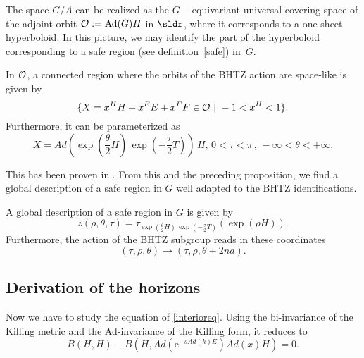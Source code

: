 The space $G/A$ can be realized as the $G-$equivariant universal covering space of the adjoint orbit ${\cal O}:= \mbox{Ad}(G)H$ in $\sldr$, where it corresponds to a one sheet hyperboloid. In this picture, we may identify the part of the hyperboloid corresponding to a safe region (see definition~\ref{safe}) in~$G$.

\begin{lemma}
	In ${\cal O}$, a connected region where the orbits of the BHTZ action are space-like is given by
	\begin{equation}
		\{ X = x^H H+x^E E + x^F F \in {\cal O} \,\, | \,\, -1 < x^H <
		1\}.
	\end{equation}
	Furthermore, it can be parameterized as
	\begin{equation}
		X = Ad\left(\exp(\frac{\theta}{2}H) \, \exp(-\frac{\tau}{2}
			T)\right)\, H, \, 0<\tau<\pi \, ,\,  -\infty<\theta<+\infty
		.
	\end{equation}
\end{lemma}
This has been proven in \cite{BTZB_un}. From this and the preceding proposition, we find a global description of a safe region in $G$ well adapted to the BHTZ identifications.

\begin{proposition}
	A global description of a safe region in $G$ is given by
	\begin{equation}\label{CoordGlob}
		z(\rho,\theta,\tau) =
		\tau_{\exp(\frac{\theta}{2}H) \,
			\exp(-\frac{\tau}{2}
			T)}(\exp(\rho H)).
	\end{equation}
	Furthermore, the action of the BHTZ subgroup reads in these coordinates
	\begin{equation}
		(\tau , \rho, \theta) \rightarrow (\tau, \rho, \theta + 2 n
		a).
	\end{equation}
\end{proposition}


\subsection{Derivation of the horizons}

Now we have to study the equation of \eqref{interioreq}. Using the bi-invariance of the Killing metric and the Ad-invariance of the Killing form, it reduces to
\begin{equation}\label{EqHoriz}
	B(H,H) - B(H,Ad(\mbox{e}^{-s Ad(k)E}) Ad(x) H) = 0.
\end{equation}

